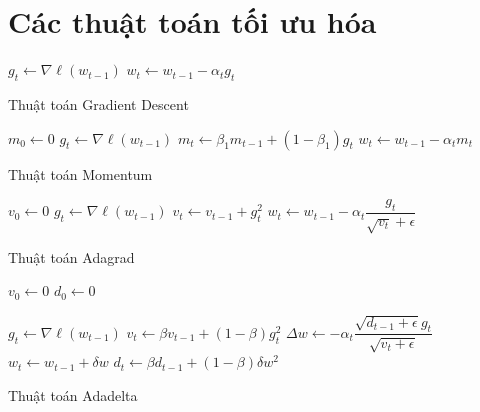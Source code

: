 \documentclass[14pt, a4paper]{article}
\theoremstyle{sltheorem}
\theoremstyle{soltheorem}
\begin{document}
\newpage
\printbibliography[title={TÀI LIỆU THAM KHẢO}]

\newpage
\appendix

\section{Các thuật toán tối ưu hóa} \label{Optimization-Algorithms}


\begin{algorithm}[h!]
    \DontPrintSemicolon

     {
        $g_t \gets \nabla \ell(w_{t-1})$\;
        $w_t \gets w_{t-1} - \alpha_t g_t$
    }
    \;
    \caption{Thuật toán Gradient Descent}
\end{algorithm}


\begin{algorithm}[h!]
    \DontPrintSemicolon
    $m_0 \gets 0$\;
     {
        $g_t \gets \nabla \ell(w_{t-1})$\;
        $m_t \gets \beta_1 m_{t-1} + (1-\beta_1) g_t$\;
        $w_t \gets w_{t-1} - \alpha_t m_t$\;
    }
    \;
    \caption{Thuật toán Momentum}
\end{algorithm}


\begin{algorithm}[h!]

    $v_0 \gets 0$\;
     {
        $g_t \gets \nabla \ell(w_{t-1})$\;
        $v_t \gets v_{t-1} + g_t^2$\;
        $w_t \gets w_{t-1} - \alpha_t \dfrac{g_t}{\sqrt{v_t} + \epsilon}$\;
    }

    \;
    \caption{Thuật toán Adagrad}
\end{algorithm}

\begin{algorithm}[h!]
    \DontPrintSemicolon

    $v_0 \gets 0$\;
    $d_0 \gets 0$\;

     {
        $g_t \gets \nabla \ell (w_{t-1})$\;
        $v_t \gets \beta v_{t-1} + (1-\beta) g_t^2$\;
        $\Delta w \gets -\alpha_t \dfrac{\sqrt{d_{t-1} + \epsilon}g_t}{\sqrt{v_t + \epsilon}}$\;
        $w_t \gets w_{t-1} + \delta w$\;
        $d_t \gets \beta d_{t-1} + (1-\beta) \delta w^2$\;
    }

    \;
    \caption{Thuật toán Adadelta}
\end{algorithm}
\end{document}
